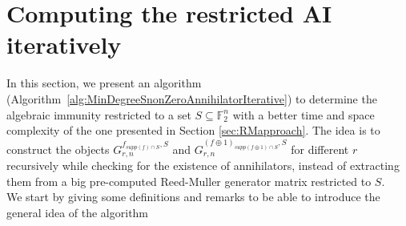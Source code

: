 \documentclass[11pt]{llncs}
\begin{document}



\section{Computing the restricted AI iteratively}\label{sec:IterativeApproach}


In this section, we present an algorithm (Algorithm~\ref{alg:MinDegreeSnonZeroAnnihilatorIterative}) to determine the algebraic immunity restricted to a set $S \subseteq \mathbb{F}_2^n$ with a better time and space complexity of the one presented in Section \ref{sec:RMapproach}.
The idea is to construct the objects $G_{r,n}^{f_{supp\left(f\right) \cap S},S}$ and $G_{r,n}^{\left(f\oplus 1\right)_{supp\left(f\oplus 1\right) \cap S},S}$ for different $r$ recursively while checking for the existence of annihilators, instead of extracting them from a big pre-computed Reed-Muller generator matrix restricted to $S$.\\

We start by giving some definitions and remarks to be able to introduce the general idea of the algorithm
\end{document}
